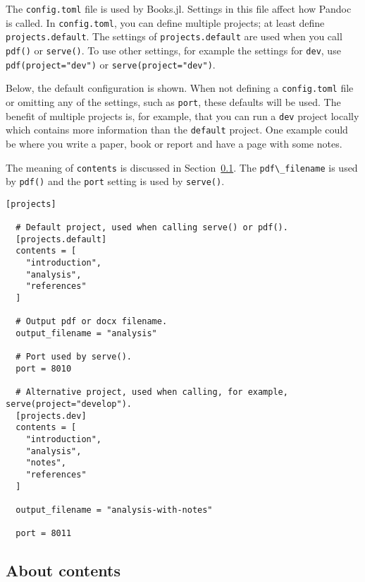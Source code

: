 \documentclass[
  14pt
  american,
  paper=a4,
  ,captions=tableheading
]{scrreprt}
\newcommand{\passthrough}[1]{#1}
\begin{document}
The \passthrough{\lstinline!config.toml!} file is used by Books.jl.
Settings in this file affect how Pandoc is called. In
\passthrough{\lstinline!config.toml!}, you can define multiple projects;
at least define \passthrough{\lstinline!projects.default!}. The settings
of \passthrough{\lstinline!projects.default!} are used when you call
\passthrough{\lstinline!pdf()!} or \passthrough{\lstinline!serve()!}. To
use other settings, for example the settings for
\passthrough{\lstinline!dev!}, use
\passthrough{\lstinline!pdf(project="dev")!} or
\passthrough{\lstinline!serve(project="dev")!}.

Below, the default configuration is shown. When not defining a
\passthrough{\lstinline!config.toml!} file or omitting any of the
settings, such as \passthrough{\lstinline!port!}, these defaults will be
used. The benefit of multiple projects is, for example, that you can run
a \passthrough{\lstinline!dev!} project locally which contains more
information than the \passthrough{\lstinline!default!} project. One
example could be where you write a paper, book or report and have a page
with some notes.

The meaning of \passthrough{\lstinline!contents!} is discussed in
Section~\ref{sec:about_contents}. The
\passthrough{\lstinline!pdf\_filename!} is used by
\passthrough{\lstinline!pdf()!} and the \passthrough{\lstinline!port!}
setting is used by \passthrough{\lstinline!serve()!}.

\begin{lstlisting}
[projects]

  # Default project, used when calling serve() or pdf().
  [projects.default]
  contents = [
    "introduction",
    "analysis",
    "references"
  ]

  # Output pdf or docx filename.
  output_filename = "analysis"

  # Port used by serve().
  port = 8010

  # Alternative project, used when calling, for example, serve(project="develop").
  [projects.dev]
  contents = [
    "introduction",
    "analysis",
    "notes",
    "references"
  ]

  output_filename = "analysis-with-notes"

  port = 8011
\end{lstlisting}

\hypertarget{sec:about_contents}{%
\subsection{About contents}\label{sec:about_contents}}
\end{document}
